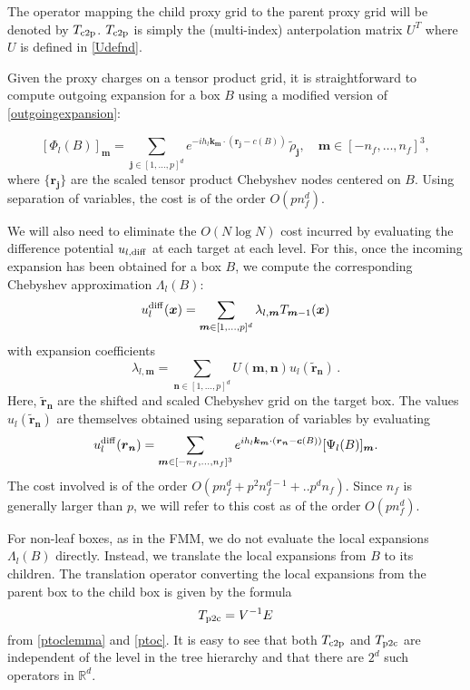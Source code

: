 \documentclass[final,letterpaper]{siamart171218}
\newcommand{\be}{\begin{equation}}
\newcommand{\ee}{\end{equation}}
\newcommand{\x}{\boldsymbol{x}}
\newcommand{\bc}{\boldsymbol{c}}
\newcommand{\bk}{\boldsymbol{k}}
\newcommand{\bm}{\boldsymbol{m}}
\newcommand{\bn}{\boldsymbol{n}}
\newcommand{\bj}{\boldsymbol{j}}
\newcommand{\br}{\boldsymbol{r}}
\begin{document}
\begin{definition}
The operator mapping the child proxy grid to the parent proxy grid will be 
denoted by $T_{\rm c2p}$. 
$T_{\rm c2p}$ is simply the (multi-index) anterpolation matrix $U^T$ where
$U$ is defined in \eqref{Udefnd}.
\end{definition}

Given the proxy charges on a tensor product grid, it is straightforward to
compute outgoing expansion for a box $B$ using a modified version of
\eqref{outgoingexpansion}:

\be\label{outgoingexpansion2}
[\Phi_{l}(B)]_{\bm}=\sum_{\bj \in [1,\dots,p]^d}
 e^{-ih_l\bk_{\bm}\cdot (\br_{\bj} - c(B))} \, \tilde \rho_{\bj}, 
\quad {\bm} \in [-n_f,\dots,n_f]^3,
\ee
where $\{ \br_{\bj} \}$ are the scaled tensor product Chebyshev nodes centered on $B$.
Using separation of variables, the cost is of the order
$O(p n_f^d)$.

We will also need to eliminate the $O(N \log N)$ cost incurred by evaluating the 
difference potential $u_{l,\rm diff}$ at each target at each level.
For this, once the incoming expansion has been obtained for a box $B$,
we compute the corresponding Chebyshev approximation $\Lambda_l(B)$:
\be
u_{l}^{\rm diff}(\x)=\sum_{\bm \in [1,\dots,p]^d}
\lambda_{l,\bm}T_{\bm-1}(\x)
\ee
with expansion coefficients 
\be\label{localexpansion}
\lambda_{l,\bm}=\sum_{\bn \in [1,\dots,p]^d} 
U(\bm,\bn) u_l(\tilde{\br}_{\bn}) \, .
\ee
Here, $\tilde{\br}_{\bn}$ are the shifted and scaled Chebyshev grid on the target box.
The values $u_l(\tilde{\br}_{\bn})$ are themselves obtained using separation of variables by 
evaluating
\be\label{incomingexpansion2}
u_{l}^{\rm diff}(\br_{\bn})=
\sum_{\bm \in [-n_f,\dots,n_f]^3} 
e^{ih_l\bk_{\bm} \cdot (\br_{\bn}-\bc(B))}[\Psi_{l}(B)]_{\bm}. 
\ee
The cost involved is of the order
$O( p n_f^d + p^2 n_f^{d-1} + .. p^d n_f)$. Since $n_f$ is generally larger than
$p$, we will refer to this cost as of the order $O(p n_f^d)$.

For non-leaf boxes, as in the FMM,
we do not evaluate the local expansions $\Lambda_l(B)$ directly.
Instead, we translate the local expansions from $B$ to its children.
The translation operator converting the local expansions from the
parent box to the child box is given by the formula
\be\label{p2ctranslation}
T_{\rm p2c}= V^{-1} E 
\ee
from \cref{ptoclemma} and \eqref{ptoc}.
It is easy to see that both $T_{\rm c2p}$ and $T_{\rm p2c}$
are independent of the level in the tree hierarchy and that there are 
$2^d$ such operators in $\mathbb{R}^d$.
\end{document}
